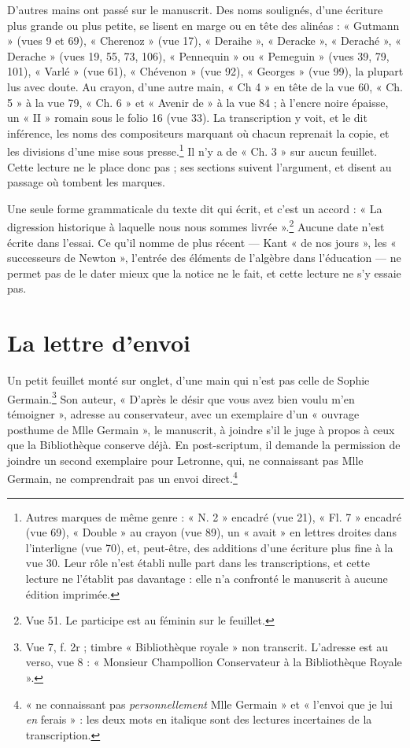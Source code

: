 \documentclass[11pt,a4paper]{article}
\begin{document}
D'autres mains ont passé sur le manuscrit. Des noms soulignés, d'une écriture
plus grande ou plus petite, se lisent en marge ou en tête des alinéas :
« Gutmann » (vues 9 et 69), « Cherenoz » (vue 17), « Deraihe », « Deracke »,
« Deraché », « Derache » (vues 19, 55, 73, 106), « Pennequin » ou « Pemeguin »
(vues 39, 79, 101), « Varlé » (vue 61), « Chévenon » (vue 92), « Georges »
(vue 99), la plupart lus avec doute. Au crayon, d'une autre main, « Ch 4 » en
tête de la vue 60, « Ch. 5 » à la vue 79, « Ch. 6 » et « Avenir de » à la
vue 84 ; à l'encre noire épaisse, un « II » romain sous le folio 16 (vue 33).
La transcription y voit, et le dit inférence, les noms des compositeurs
marquant où chacun reprenait la copie, et les divisions d'une mise sous
presse.\footnote{Autres marques de même genre : « N. 2 » encadré (vue 21),
« Fl. 7 » encadré (vue 69), « Double » au crayon (vue 89), un « avait » en
lettres droites dans l'interligne (vue 70), et, peut-être, des additions d'une
écriture plus fine à la vue 30. Leur rôle n'est établi nulle part dans les
transcriptions, et cette lecture ne l'établit pas davantage : elle n'a
confronté le manuscrit à aucune édition imprimée.} Il n'y a de « Ch. 3 » sur
aucun feuillet. Cette lecture ne le place donc pas ; ses sections suivent
l'argument, et disent au passage où tombent les marques.

Une seule forme grammaticale du texte dit qui écrit, et c'est un accord :
« La digression historique à laquelle nous nous sommes livrée ».\footnote{Vue
51. Le participe est au féminin sur le feuillet.} Aucune date n'est écrite
dans l'essai. Ce qu'il nomme de plus récent — Kant « de nos jours », les
« successeurs de Newton », l'entrée des éléments de l'algèbre dans
l'éducation — ne permet pas de le dater mieux que la notice ne le fait, et
cette lecture ne s'y essaie pas.

\section*{La lettre d'envoi}

Un petit feuillet monté sur onglet, d'une main qui n'est pas celle de Sophie
Germain.\footnote{Vue 7, f. 2r ; timbre « Bibliothèque royale » non transcrit.
L'adresse est au verso, vue 8 : « Monsieur Champollion Conservateur à la
Bibliothèque Royale ».} Son auteur, « D'après le désir que vous avez bien voulu
m'en témoigner », adresse au conservateur, avec un exemplaire d'un « ouvrage
posthume de Mlle Germain », le manuscrit, à joindre s'il le juge à propos à
ceux que la Bibliothèque conserve déjà. En post-scriptum, il demande la
permission de joindre un second exemplaire pour Letronne, qui, ne connaissant
pas Mlle Germain, ne comprendrait pas un envoi direct.\footnote{« ne connaissant
pas \emph{personnellement} Mlle Germain » et « l'envoi que je lui \emph{en}
ferais » : les deux mots en italique sont des lectures incertaines de la
transcription.}
\end{document}
